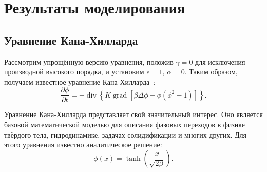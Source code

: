 %
%

\section{Результаты моделирования}
\subsection{Уравнение Кана-Хилларда}
Рассмотрим упрощённую версию уравнения, положив $\gamma = 0$ для исключения производной высокого порядка, и установим $\epsilon = 1$, $\alpha = 0$. Таким образом, получаем известное уравнение Кана-Хилларда~\cite{cahn_1958}:
\begin{equation*}
    \frac{\partial \phi}{\partial t} = -\operatorname{div}\left\{K \operatorname{grad}\left[\beta \Delta \phi - \phi (\phi^2 - 1)\right]\right\}.
\end{equation*}


Уравнение Кана-Хилларда представляет свой значительный интерес. Оно является базовой математической моделью для описания фазовых переходов в физике твёрдого тела, гидродинамике, задачах солидификации и многих других.
Для этого уравнения известно аналитическое решение:
\begin{equation} \label{analit}
    \phi(x) = \tanh\left(\frac{x} { \sqrt{2  \beta } }\right).
\end{equation}



